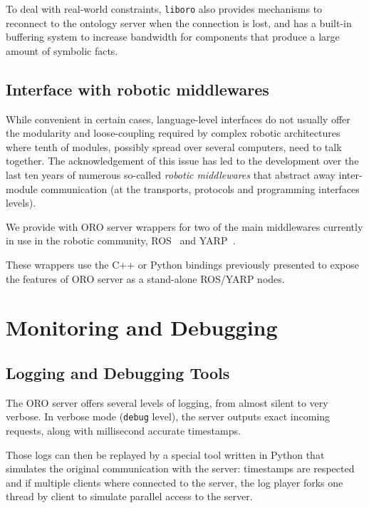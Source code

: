 To deal with real-world constraints, {\tt liboro} also provides mechanisms to
reconnect to the ontology server when the connection is lost, and has a
built-in buffering system to increase bandwidth for components that produce a
large amount of symbolic facts.

\subsection{Interface with robotic middlewares}
\label{sect|interfacing-middlewares}

While convenient in certain cases, language-level interfaces do not usually
offer the modularity and loose-coupling required by complex robotic
architectures where tenth of modules, possibly spread over several computers,
need to talk together. The acknowledgement of this issue has led to the
development over the last ten years of numerous so-called \emph{robotic
middlewares} that abstract away inter-module communication (at the transports,
protocols and programming interfaces levels).

We provide with ORO server wrappers for two of the main middlewares currently
in use in the robotic community, ROS~\cite{Quigley2009} and
YARP~\cite{Metta2006}.

These wrappers use the C++ or Python bindings previously presented to expose
the features of ORO server as a stand-alone ROS/YARP nodes.

\section{Monitoring and Debugging}
\label{sect|monitoring}

\subsection{Logging and Debugging Tools}

The ORO server offers several levels of logging, from almost silent to very
verbose. In verbose mode ({\tt debug} level), the server outputs exact incoming
requests, along with millisecond accurate timestamps.

Those logs can then be replayed by a special tool written in Python that
simulates the original communication with the server: timestamps are respected
and if multiple clients where connected to the server, the log player forks one
thread by client to simulate parallel access to the server.


